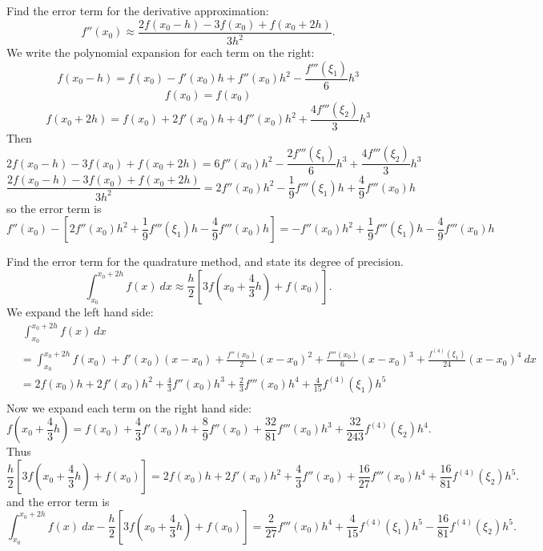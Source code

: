 \documentclass{eh-homework}
\begin{document}
    \begin{question}{1}
        Find the error term for the derivative approximation:
        \[
            f''(x_0) \approx \frac{2f(x_0 - h) - 3f(x_0) + f(x_0 + 2h)}{3h^2}.
        \]
        We write the polynomial expansion for each term on the right:
        \[
            f(x_0 - h) = f(x_0) - f'(x_0)h +f''(x_0)h^2 - \frac{f'''(\xi_1)}{6}h^3
        \]
        \[
            f(x_0) = f(x_0)
        \]
        \[
            f(x_0 + 2h) = f(x_0) + 2f'(x_0)h + 4f''(x_0)h^2 + \frac{4f'''(\xi_2)}{3}h^3
        \]
        Then
        \[
            2f(x_0 - h) - 3f(x_0) + f(x_0 + 2h) = 6f''(x_0)h^2 -\frac{2f'''(\xi_1)}{6}h^3 + \frac{4f'''(\xi_2)}{3}h^3
        \]
        \[
            \frac{2f(x_0 - h) - 3f(x_0) + f(x_0 + 2h)}{3h^2} = 2f''(x_0)h^2 - \frac{1}{9}f'''(\xi _1)h + \frac{4}{9}f'''(x_0)h
        \]
        so the error term is
        \[
            f''(x_0) - \left[2f''(x_0)h^2 + \frac{1}{9}f'''(\xi _1)h - \frac{4}{9}f'''(x_0)h \right] = - f''(x_0)h^2 + \frac{1}{9}f'''(\xi _1)h - \frac{4}{9}f'''(x_0)h
        \]
    \end{question}
    \begin{question}{2}
        Find the error term for the quadrature method, and state its degree of precision.
        \[
            \int _{x_0}^{x_0 + 2h}f(x)\ dx \approx \frac{h}{2}\left[ 3f \left( x_0 + \frac{4}{3}h \right) + f(x_0) \right].
        \]
        We expand the left hand side:
        \begin{align*}
            &\ \int _{x_0}^{x_0 + 2h} f(x)\ dx \\
            &= \int _{x_0}^{x_0 + 2h} f(x_0) + f'(x_0)(x - x_0) + \frac{f''(x_0)}{2}(x - x_0)^2 + \frac{f'''(x_0)}{6}(x - x_0)^3 + \frac{f^{(4)}(\xi_1)}{24}(x - x_0)^4\ dx \\
            &= 2f(x_0)h + 2f'(x_0)h^2 + \frac{4}{3}f''(x_0)h^3 + \frac{2}{3}f'''(x_0)h^4 + \frac{4}{15}f^{(4)}(\xi _1)h^5 \\
        \end{align*}
        Now we expand each term on the right hand side:
        \[
            f \left( x_0 + \frac{4}{3}h \right) = f(x_0) + \frac{4}{3}f'(x_0)h + \frac{8}{9}f''(x_0) + \frac{32}{81}f'''(x_0)h^3 + \frac{32}{243}f^{(4)}(\xi _2)h^4.
        \]
        Thus
        \[
            \frac{h}{2}\left[ 3f \left( x_0 + \frac{4}{3}h \right) + f(x_0) \right] = 2f(x_0)h + 2f'(x_0)h^2 + \frac{4}{3}f''(x_0) + \frac{16}{27}f'''(x_0)h^4 + \frac{16}{81}f^{(4)}(\xi_2)h^5.
        \]
        and the error term is
        \[
            \int _{x_0}^{x_0 + 2h}f(x)\ dx - \frac{h}{2}\left[ 3f \left( x_0 + \frac{4}{3}h \right) + f(x_0) \right] = \frac{2}{27}f'''(x_0)h^4 + \frac{4}{15}f^{(4)}(\xi _1)h^5 - \frac{16}{81}f^{(4)}(\xi _2)h^5.
        \]
    \end{question}
\end{document}
